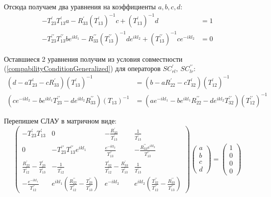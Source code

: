 \documentclass[a4 paper, 12 pt]{extarticle}
\begin{document}
   Отсюда получаем два уравнения на коэффициенты $a, b, c, d$:
   \[
   \begin{aligned}
   -T_{23}^\prime T_{13}^\prime a - R_{33}^\prime \left(T_{13}^\prime\right)^{-1}c + \left(T_{13}^\prime\right)^{-1}d &= 1 \\
   -T_{23}^{\prime\prime} T_{13}^{\prime\prime} b e^{ikl_1} - R_{33}^{\prime\prime} \left(T_{13}^{\prime\prime}\right)^{-1}d e^{ikl_2} + \left(T_{13}^{\prime\prime}\right)^{-1}c e^{-ikl_2} &= 0
   \end{aligned}\]
   
   Оставшиеся 2 уравнения получим из условия совместности (\ref{compabilityConditionGeneralized}) для операторов $SC_{rl}^\prime, \ SC_{lr}^{\prime\prime}$:
   \[
   \begin{aligned}
   \left(d-aT_{23}^\prime -cR_{33}^\prime\right)\left(T_{13}^\prime\right)^{-1} &= \left(b-aR_{22}^\prime -c T_{32}^\prime\right)\left(T_{12}^\prime\right)^{-1} \\
   \left(c e^{-ikl_2}-b e^{ikl_1} T_{23}^{\prime\prime}-d e^{ikl_2}R_{33}^{\prime\prime}\right)\left(T_{13}\right)^{-1} &= \left(a e^{-ikl_1} - b e^{ikl_1} R_{22}^{\prime\prime} -d e^{ikl_2} T_{32}^{\prime\prime}\right)\left(T_{12}^{\prime\prime}\right)^{-1}
   \end{aligned}
   \]
   
   Перепишем СЛАУ в матричном виде:
   \[
   \begin{pmatrix}
   -T_{23}^{\prime}T_{13}^{\prime} & 0 & -\frac{R_{33}^{\prime}}{T_{13}^\prime} & \frac{1}{T_{13}^\prime}\\ 
   0 & -T_{23}^{\prime\prime} T_{13}^{\prime\prime} e^{ikl_1}  & \frac{e^{-ikl_2}}{T_{13}^{\prime\prime}} & -\frac{R_{33}^{\prime\prime}e^{ikl_2}}{T_{13}^{\prime\prime}} \\ 
   \frac{R_{22}^{\prime}}{T_{12}^{\prime}}-\frac{T_{23}^{\prime}}{T_{13}^{\prime}} & -\frac{1}{T_{12}^{\prime}} & \frac{T_{32}^{\prime}}{T_{12}^{\prime}}-\frac{R_{33}^{\prime}}{T_{13}^{\prime}} & \frac{1}{T_{13}^{\prime}}\\ 
   -\frac{e^{-ikl_1}}{T_{12}^{\prime\prime}} & e^{ikl_1}\left(\frac{R_{22}^{\prime\prime}}{T_{12}^{\prime\prime}} - \frac{T_{23}^{\prime\prime}}{T_{13}^{\prime\prime}}\right) & e^{-ikl_2} & e^{ikl_2}\left(\frac{T_{32}^{\prime\prime}}{T_{12}^{\prime\prime}} - \frac{R_{33}^{\prime\prime}}{T_{13}^{\prime\prime}}\right)
   \end{pmatrix}
   \begin{pmatrix}
   a \\
   b \\
   c \\
   d
   \end{pmatrix} = 
   \begin{pmatrix}
   1 \\
   0 \\
   0 \\
   0 
   \end{pmatrix}\]
   
\end{document}
